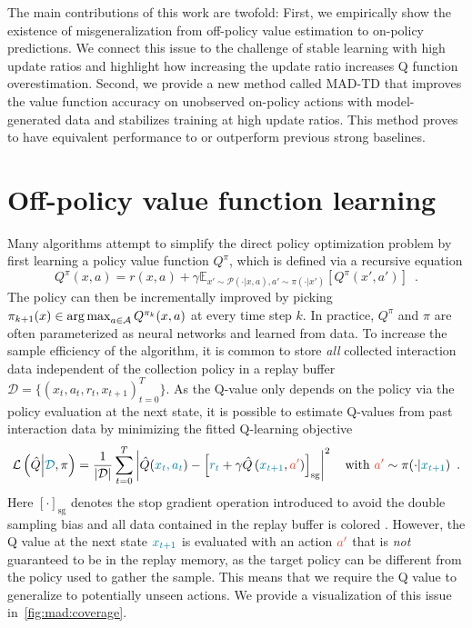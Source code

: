 The main contributions of this work are twofold:
First, we empirically show the existence of misgeneralization from off-policy value estimation to on-policy predictions. We connect this issue to the challenge of stable learning with high update ratios and highlight how increasing the update ratio increases Q function overestimation.
Second, we provide a new method called MAD-TD that improves the value function accuracy on unobserved on-policy actions with model-generated data and stabilizes training at high update ratios. This method proves to have equivalent performance to or outperform previous strong baselines.

\section{Off-policy value function learning}

Many algorithms attempt to simplify the direct policy optimization problem by first learning a policy value function $Q^\pi$, which is defined via a recursive equation%
\begin{equation*}
Q^\pi(x,a) = r(x,a) + \gamma \mathbb{E}_{x' \sim \mathcal{P}(\cdot|x,a), a' \sim \pi(\cdot|x')}\left[Q^\pi(x',a')\right]\enspace.    
\end{equation*}
The policy can then be incrementally improved by picking 
$\pi_{k+1}(x) \in \operatorname*{arg\,max}_{a \in \mathcal{A}} Q^{\pi_k}(x,a)\label{eq:mad:pi_update}$
at every time step $k$.
In practice, $Q^\pi$ and $\pi$ are often parameterized as neural networks and learned from data. 
To increase the sample efficiency of the algorithm, it is common to store \textit{all} collected interaction data independent of the collection policy in a replay buffer $\mathcal{D} = \{(x_t, a_t, r_t, x_{t+1})_{t=0}^{T}\}$.
As the Q-value only depends on the policy via the policy evaluation at the next state, it is possible to estimate Q-values from past interaction data by minimizing the fitted Q-learning objective 
\begin{align}
\mathcal{L}\left(\hat{Q}\middle|\blue{\mathcal{D}}, \pi\right) = \frac{1}{|\mathcal{D}|} \sum_{t=0}^T \left| \hat{Q}(\blue{x_t,a_t}) - \left[\blue{r_t} + \gamma \hat{Q}\left(\blue{x_{t+1}}, \red{a'}\right)\right]_\mathrm{sg} \right|^2\quad \mathrm{with }~\red{a'}\sim \pi(\cdot|\blue{x_{t+1}}) \enspace. \label{eq:mad:off_policy_q_update}
\end{align}
Here $[\cdot]_\mathrm{sg}$ denotes the stop gradient operation introduced to avoid the double sampling bias and all data contained in the replay buffer is colored . 
However, the Q value at the next state $\blue{x_{t+1}}$ is evaluated with an action $\red{a'}$ that is \emph{not} guaranteed to be in the replay memory, as the target policy can be different from the policy used to gather the sample.
This means that we require the Q value to generalize to potentially unseen actions.
We provide a visualization of this issue in~\autoref{fig:mad:coverage}.

